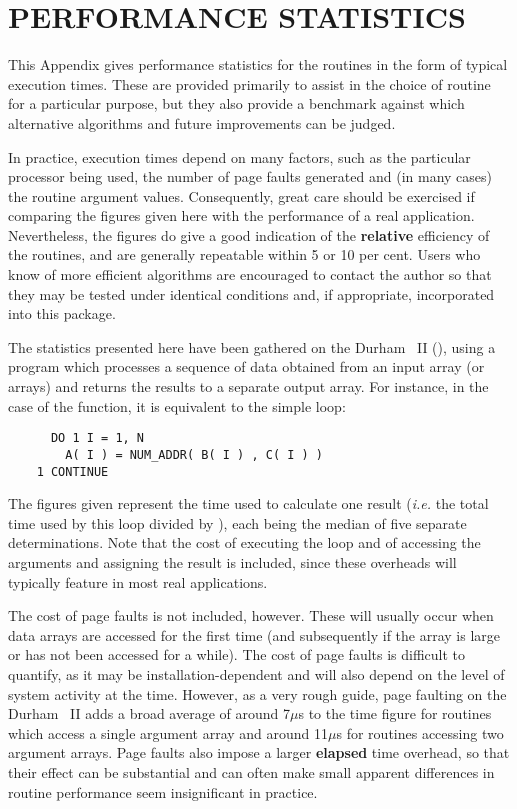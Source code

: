 \newpage

\section{PERFORMANCE STATISTICS}

\label{appendix:statistics}

This Appendix gives performance statistics for the  routines
in the form of typical execution times. 
These are provided primarily to assist in the choice of routine for a 
particular purpose, but they also provide a benchmark against which 
alternative algorithms and future improvements can be judged.

In practice, execution times depend on many factors, such as the
particular processor being used, the number of page faults generated
and (in many cases) the routine argument values.
Consequently, great care should be exercised if comparing the figures given
here with the performance of a real application.
Nevertheless, the figures do give a good indication of the {\bf relative}
efficiency of the routines, and are generally repeatable within 5 or 10 per
cent. 
Users who know of more efficient algorithms are encouraged to contact the
author so that they may be tested under identical conditions and, if
appropriate, incorporated into this package. 

The statistics presented here have been gathered on the Durham
~II (), using a program which processes a
sequence of data obtained from an input array (or arrays) and returns the
results to a separate output array. 
For instance, in the case of the  function, it is equivalent 
to the simple loop:

\begin{verbatim}
      DO 1 I = 1, N
        A( I ) = NUM_ADDR( B( I ) , C( I ) )
    1 CONTINUE
\end{verbatim}

The figures given represent the  time used to calculate one result
({\em i.e.} the total  time used by this loop divided by
), each being the median of five separate determinations. 
Note that the cost of executing the loop and of accessing the arguments and
assigning the result is included, since these overheads will typically
feature in most real applications. 

The cost of page faults is not included, however.
These will usually occur when data arrays are accessed for the first time
(and subsequently if the array is large or has not been accessed for a while).
The cost of page faults is difficult to quantify, as it may be
installation-dependent and will also depend on the level of system activity
at the time. 
However, as a very rough guide, page faulting on the Durham ~II
adds a broad average of around 7$\mu$s to the  time figure for
routines which access a single  argument array and around 11$\mu$s
for routines accessing two  argument arrays.
Page faults also impose a larger {\bf elapsed} time overhead, so that their
effect can be substantial and can often make small apparent differences in
routine performance seem insignificant in practice. 

